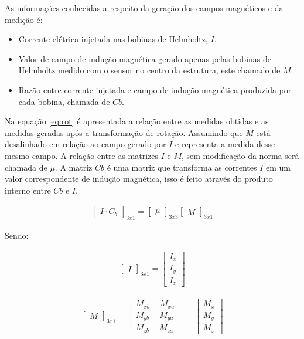 As informações conhecidas a respeito da geração dos campos magnéticos e da medição é:
\begin{itemize}
    \item Corrente elétrica injetada nas bobinas de Helmholtz, $I$.
    \item Valor de campo de indução magnética gerado apenas pelas bobinas de Helmholtz medido com o sensor no centro da estrutura, este chamado de $M$. 
    \item Razão entre corrente injetada e campo de indução magnética produzida por cada bobina, chamada de $Cb$.
\end{itemize}

Na equação \ref{eq:rot} é apresentada a relação entre as medidas obtidas e as medidas geradas após a transformação de rotação. Assumindo que $M$ está desalinhado em relação ao campo gerado por $I$ e representa a medida desse mesmo campo. A relação entre as matrizes $I$ e $M$, sem modificação da norma será chamada de $\mu$. A matriz $Cb$ é uma matriz que transforma as correntes $I$ em um valor correspondente de indução magnética, isso é feito através do produto interno entre $Cb$ e $I$.

\begin{gather}
\label{eq:rot}
 \begin{bmatrix} I\cdot C_b \end{bmatrix}_{3x1}
 =
  \begin{bmatrix}
   \mu
   \end{bmatrix}_{3x3}
 \begin{bmatrix} M \end{bmatrix}_{3x1}
\end{gather}

Sendo:

\begin{gather}
\label{eq:mI}
 \begin{bmatrix} I \end{bmatrix}_{3x1}
 =
  \begin{bmatrix}
   I_x \\
   I_y \\
   I_z
   \end{bmatrix}
\end{gather}


\begin{gather}
\label{eq:mM}
 \begin{bmatrix} M \end{bmatrix}_{3x1}
 =
  \begin{bmatrix}
   M_{xb} - M_{xa} \\
   M_{yb} - M_{ya} \\
   M_{zb} - M_{za}
   \end{bmatrix}
 =
  \begin{bmatrix}
   M_x \\
   M_y \\
   M_z
   \end{bmatrix}
\end{gather}

